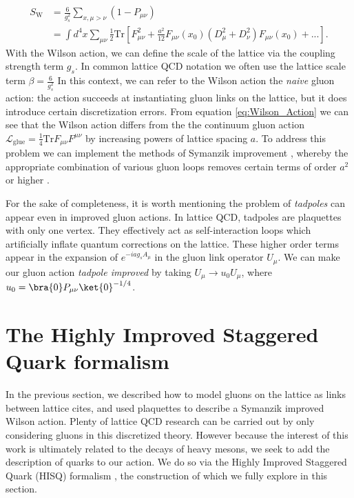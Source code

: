 \begin{equation}\label{eq:Wilson_Action}
\begin{split}
    S_\mathrm{W} &= \frac{6}{g_s^2} \sum_{x,\mu > \nu}(1-P_{\mu\nu})\\
    &= \int d^4x \sum_{\mu\nu} \frac{1}{2}\mathrm{Tr}
    \left[
    F^2_{\mu\nu} + \frac{a^2}{12}F_{\mu\nu}(x_0)(D_\mu^2 + D_\nu^2)F_{\mu\nu}(x_0) +...
    \right] .
\end{split}
\end{equation}
With the Wilson action, we can define the scale of the lattice via the coupling strength term $g_s$. In common lattice QCD notation we often use the lattice scale term $\beta = \frac{6}{g^2_s}$ In this context, we can refer to the Wilson action the \textit{naive} gluon action: the action succeeds at instantiating gluon links on the lattice, but it does introduce certain discretization errors.  From equation \ref{eq:Wilson_Action} we can see that the Wilson action differs from the the continuum gluon action $\mathcal{L_{\mathrm{glue}}}=\frac{1}{4}\mathrm{Tr}F_{\mu\nu}F^{\mu\nu}$ by increasing powers of lattice spacing $a$.  To address this problem we can implement the methods of Symanzik improvement \cite{SYMANZIK1983187}, whereby the appropriate combination of various gluon loops removes certain terms of order $a^2$ or higher \cite{Luscher1985}.  

For the sake of completeness, it is worth mentioning the problem of \textit{tadpoles} can appear even in improved gluon actions.  In lattice QCD, tadpoles are plaquettes with only one vertex.  They effectively act as self-interaction loops which artificially inflate quantum corrections on the lattice.  These higher order terms appear in the expansion of $e^{-iag_sA_\mu}$ in the gluon link operator $U_\mu$.  We can make our gluon action \textit{tadpole improved} \cite{PhysRevD.48.2250} by taking $U_\mu \rightarrow u_0U_\mu$, where $u_0 = \bra{0}P_{\mu\nu}\ket{0}^{-1/4}$.


\section{The Highly Improved Staggered Quark formalism}\label{sec:HISQ}
In the previous section, we described how to model gluons on the lattice as links between lattice cites, and used plaquettes to describe a Symanzik improved Wilson action.  Plenty of lattice QCD research can be carried out by only considering gluons in this discretized theory.  However because the interest of this work is ultimately related to the decays of heavy mesons, we seek to add the description of quarks to our action.  We do so via the Highly Improved Staggered Quark (HISQ) formalism \cite{HISQ:2006rc}, the construction of which we fully explore in this section.

